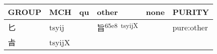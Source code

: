 \documentclass[14pt,a4paper]{scrartcl}
\begin{document}
\begin{longtable}[c]{@{}llllll@{}}
\toprule
\begin{minipage}[b]{0.14\columnwidth}\raggedright\strut
GROUP
\strut\end{minipage} &
\begin{minipage}[b]{0.14\columnwidth}\raggedright\strut
MCH
\strut\end{minipage} &
\begin{minipage}[b]{0.14\columnwidth}\raggedright\strut
qu
\strut\end{minipage} &
\begin{minipage}[b]{0.14\columnwidth}\raggedright\strut
other
\strut\end{minipage} &
\begin{minipage}[b]{0.14\columnwidth}\raggedright\strut
none
\strut\end{minipage} &
\begin{minipage}[b]{0.14\columnwidth}\raggedright\strut
PURITY
\strut\end{minipage}\tabularnewline
\midrule
\endhead
\begin{minipage}[t]{0.14\columnwidth}\raggedright\strut
匕
\strut\end{minipage} &
\begin{minipage}[t]{0.14\columnwidth}\raggedright\strut
tsyij
\strut\end{minipage} &
\begin{minipage}[t]{0.14\columnwidth}\raggedright\strut
\strut\end{minipage} &
\begin{minipage}[t]{0.14\columnwidth}\raggedright\strut
旨\textsuperscript{65e8~tsyijX}
\strut\end{minipage} &
\begin{minipage}[t]{0.14\columnwidth}\raggedright\strut
\strut\end{minipage} &
\begin{minipage}[t]{0.14\columnwidth}\raggedright\strut
pure:other
\strut\end{minipage}\tabularnewline
\begin{minipage}[t]{0.14\columnwidth}\raggedright\strut
㫖
\strut\end{minipage} &
\begin{minipage}[t]{0.14\columnwidth}\raggedright\strut
tsyijX
\strut\end{minipage} &
\begin{minipage}[t]{0.14\columnwidth}\raggedright\strut
\strut\end{minipage} &

\end{longtable}
\end{document}
